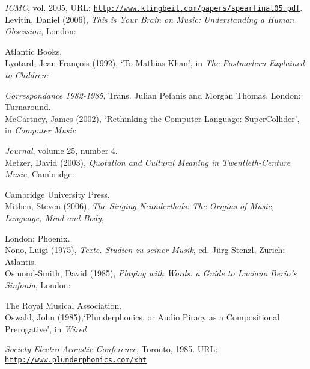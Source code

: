 \emph{ICMC}, vol. 2005, URL: \href{http://www.klingbeil.com/papers/spearfinal05.pdf}{\texttt{http://www.klingbeil.com/papers/spearfinal05.pdf}}.
\hypertarget{musmind}{} \\ 
Levitin, Daniel (2006), \emph{This is Your Brain on Music: Understanding a Human Obsession}, London: 

Atlantic Books. 
\hypertarget{lyotard}{}\\
Lyotard, Jean-Fran\c{c}ois (1992), `To Mathias Khan', in \emph{The Postmodern Explained to Children:} 

\emph{Correspondance 1982-1985}, Trans. Julian Pefanis and Morgan Thomas, London: Turnaround. 
\hypertarget{mccartney}{}\\
McCartney, James (2002), `Rethinking the Computer Language: SuperCollider', in \emph{Computer Music} 

\emph{Journal}, volume 25, number 4.
\hypertarget{metzer}{}\\
Metzer, David (2003), \emph{Quotation and Cultural Meaning in Twentieth-Centure Music}, Cambridge: 

Cambridge University Press. 
\hypertarget{mithen}{}\\
Mithen, Steven (2006), \emph{The Singing Neanderthals: The Origins of Music, Language, Mind and Body}, 

London: Phoenix. 
\hypertarget{nono}{}\\
Nono, Luigi (1975), \emph{Texte. Studien zu seiner Musik}, ed. J\"{u}rg Stenzl, Z\"{u}rich: Atlantis. 
\hypertarget{ossmith}{}\\
Osmond-Smith, David (1985), \emph{Playing with Words: a Guide to Luciano Berio's Sinfonia},  London: 

The Royal Musical Association. 
\hypertarget{oswald}{}\\
Oswald, John (1985),`Plunderphonics, or Audio Piracy as a Compositional Prerogative', in \emph{Wired}

\emph{Society Electro-Acoustic Conference}, Toronto, 1985. URL: \href{http://www.plunderphonics.com/xhtml/xplunder.html}{\texttt{http://www.plunderphonics.com/xht}}

